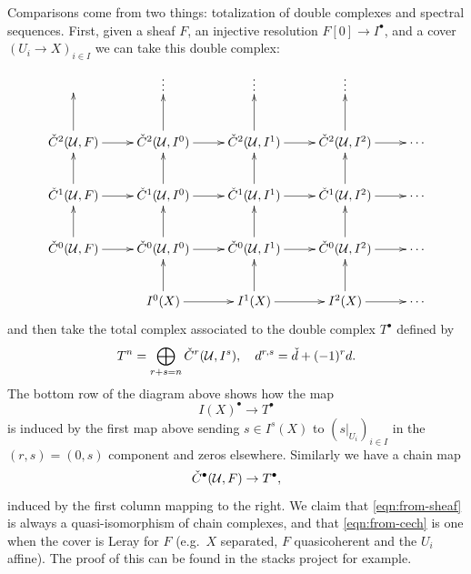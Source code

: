 \documentclass[12pt]{article}
\numberwithin{equation}{section}
\theoremstyle{definition}
\theoremstyle{remark}
\newcommand{\Ucal}{\mathcal{U}}
\newcommand{\Hv}{\Check{H}}
\newcommand{\Cv}{\Check{C}}
\newcommand{\taylor}[1]{{\color{blue} \sf $\spadesuit\spadesuit\spadesuit$ Taylor: [#1]}}
\begin{document}
Comparisons come from two things: totalization of double complexes and spectral sequences.
First, given a sheaf $F$, an injective resolution $F[0] \to I^{\bullet}$, and a cover $(U_i\to X)_{i\in I}$ we can take this double complex:
$$
\xymatrix{
	& \vdots & \vdots & \vdots  &  \\
	\Cv^2(\Ucal,F) \ar[u] \ar[r]&\Cv^2(\Ucal,I^0) \ar[r] \ar[u] & \Cv^2(\Ucal,I^1) \ar[r] \ar[u] & \Cv^2(\Ucal,I^2) \ar[r]  \ar[u] & \cdots \\
	\Cv^1(\Ucal,F) \ar[u] \ar[r] &\Cv^1(\Ucal,I^0) \ar[r] \ar[u] & \Cv^1(\Ucal,I^1) \ar[r] \ar[u] & \Cv^1(\Ucal,I^2) \ar[r] \ar[u] & \cdots \\
	\Cv^0(\Ucal,F) \ar[u] \ar[r]&\Cv^0(\Ucal,I^0) \ar[r] \ar[u] & \Cv^0(\Ucal,I^1) \ar[r] \ar[u] & \Cv^0(\Ucal,I^2) \ar[r] \ar[u] & \cdots \\
	&I^0(X) \ar[r] \ar[u] & I^1(X) \ar[r] \ar[u] & I^2(X) \ar[r] \ar[u] & \cdots \\
}$$
and then take the total complex associated to the double complex $T^{\bullet}$ defined by 
 $$ T^n = \bigoplus_{r+s=n}\Cv^r(\Ucal,I^s), \quad d^{r,s} = \Check{d}+(-1)^r d.$$
The bottom row of the diagram above shows how the map 
\begin{equation}\label{eqn:from-sheaf}
I(X)^{\bullet}\to T^{\bullet}
\end{equation}
is induced by the first map above sending $s\in I^s(X)$ to $(s\vert_{U_i})_{i \in I}$ in the $(r,s)=(0,s)$ component and zeros elsewhere. 
Similarly we have a chain map 
\begin{equation}\label{eqn:from-cech}
\Cv^{\bullet}(\Ucal,F) \to T^{\bullet}, 
\end{equation}
induced by the first column mapping to the right. 
We claim that \eqref{eqn:from-sheaf} is always a quasi-isomorphism of chain complexes, and that \eqref{eqn:from-cech} is one when the cover is Leray for $F$ (e.g.\ $X$ separated, $F$ quasicoherent and the $U_i$ affine). 
The proof of this can be found in the stacks project for example.

\end{document}
